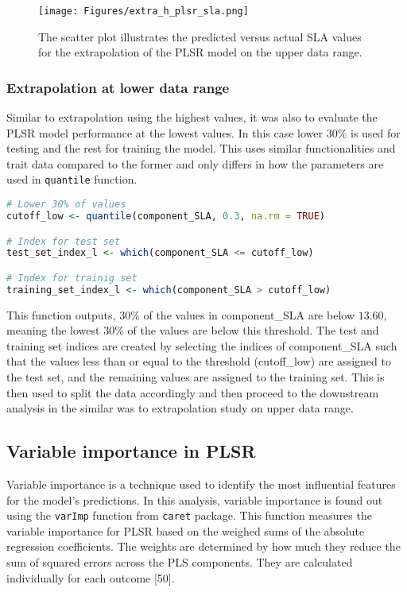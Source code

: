 \documentclass[12pt,a4paper]{report}
\begin{document}
\begin{figure}[h]
    \centering
    \texttt{[image: Figures/extra\_h\_plsr\_sla.png]}
    \caption{The scatter plot illustrates the predicted versus actual SLA values for the extrapolation of the PLSR model on the upper data range.}
    \label{fig:extra_h_plsr}
\end{figure}


\subsubsection*{Extrapolation at lower data range}
Similar to extrapolation using the highest values, it was also to evaluate the PLSR model performance at the lowest values. In this case lower $30\%$ is used for testing and the rest for training the model. This uses similar functionalities and trait data compared to the former and only differs in how the parameters are used in \texttt{quantile} function. \\

\begin{lstlisting}[language=R, style=mystyle]
# Lower 30% of values
cutoff_low <- quantile(component_SLA, 0.3, na.rm = TRUE)

# Index for test set
test_set_index_l <- which(component_SLA <= cutoff_low)

# Index for trainig set
training_set_index_l <- which(component_SLA > cutoff_low)
\end{lstlisting}

This function outputs, $30\%$ of the values in component\_SLA are below $13.60$, meaning the lowest $30\%$ of the values are below this threshold. The test and training set indices are created by selecting the indices of component\_SLA such that the values less than or equal to the threshold (cutoff\_low) are assigned to the test set, and the remaining values are assigned to the training set. This is then used to split the data accordingly and then proceed to the downstream analysis in the similar was to extrapolation study on upper data range.

\subsection{Variable importance in PLSR}
Variable importance is a technique used to identify the most influential features for the model's predictions. In this analysis, variable importance is found out using the \texttt{varImp} function from \texttt{caret} package. This function measures the variable importance for PLSR based on the weighed sums of the absolute regression coefficients. The weights are determined by how much they reduce the sum of squared errors across the PLS components. They are calculated individually for each outcome [50].\\
\end{document}
